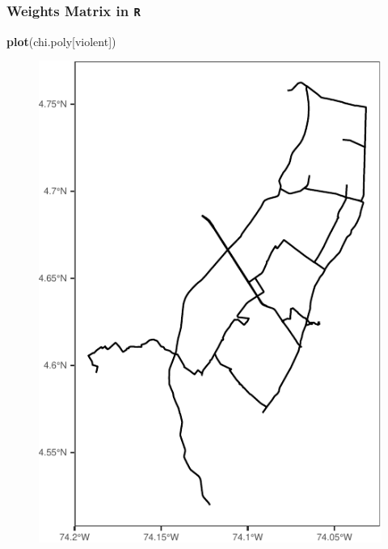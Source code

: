 \documentclass[
  shownotes,
  xcolor={svgnames},
  hyperref={colorlinks,citecolor=DarkBlue,linkcolor=DarkRed,urlcolor=DarkBlue}
   , aspectratio=169]{beamer}
\newenvironment{Shaded}{\begin{snugshade}}{\end{snugshade}}
\newcommand{\KeywordTok}[1]{\textcolor[rgb]{0.13,0.29,0.53}{\textbf{#1}}}
\newcommand{\NormalTok}[1]{#1}
\newcommand{\StringTok}[1]{\textcolor[rgb]{0.31,0.60,0.02}{#1}}
\begin{document}
\begin{frame}[fragile]
\frametitle{Weights Matrix in \texttt{R}}

\begin{scriptsize}
\begin{Shaded}
\begin{Highlighting}[]
\KeywordTok{plot}\NormalTok{(chi.poly[}\StringTok{\textquotesingle{}violent\textquotesingle{}}\NormalTok{])}
\end{Highlighting}
\end{Shaded}
\end{scriptsize}



  \begin{figure}[H] \centering
    \captionsetup{justification=centering}
    \includegraphics[scale=0.5]{figures/unnamed-chunk-2-1.pdf}
   \end{figure}



\end{frame}
\end{document}
